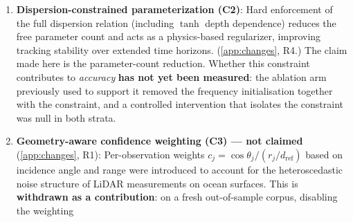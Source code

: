 \documentclass[review]{elsarticle}
\begin{document}
\begin{enumerate}
  \item \textbf{Dispersion-constrained parameterization (C2)}: Hard
    enforcement of the full dispersion relation (including $\tanh$
    depth dependence) reduces the free parameter count and acts as a
    physics-based regularizer, improving tracking stability over
    extended time horizons.
    (\ref{app:changes}, R4.) The claim made here is the parameter-count
    reduction. Whether this constraint contributes to \emph{accuracy}
    \textbf{has not yet been measured}: the ablation arm previously used to
    support it removed the frequency initialisation together with the
    constraint, and a controlled intervention that isolates the constraint
    was null in both strata.
  \item \textbf{Geometry-aware confidence weighting (C3) --- not claimed}
    (\ref{app:changes}, R1): Per-observation weights
    $c_j = \cos\theta_j/(r_j/d_{\text{ref}})$ based on incidence angle and
    range were introduced to account for the heteroscedastic noise structure
    of LiDAR measurements on ocean surfaces. This is \textbf{withdrawn as a
    contribution}: on a fresh out-of-sample corpus, disabling the weighting

\end{enumerate}
\end{document}
